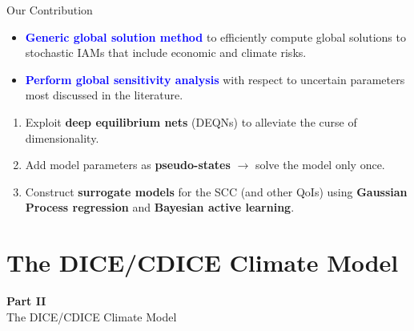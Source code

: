 \documentclass[aspectratio=169,11pt]{beamer}
\newcommand{\emphc}[1]{\textcolor{harvardcrimson}{#1}}
\begin{document}
\begin{frame}{Our Contribution}
\begin{itemize}
    \item \textcolor{blue}{\textbf{Generic global solution method}} to efficiently compute global solutions to stochastic IAMs that include economic and climate risks.
    \item \textcolor{blue}{\textbf{Perform global sensitivity analysis}} with respect to uncertain parameters most discussed in the literature.
\end{itemize}

\vspace{0.2cm}
\begin{enumerate}
    \item Exploit \textbf{deep equilibrium nets} (DEQNs) to alleviate the curse of dimensionality.
    \item Add model parameters as \textbf{pseudo-states} $\rightarrow$ solve the model only \emphc{once}.
    \item Construct \textbf{surrogate models} for the SCC (and other QoIs) using \textbf{Gaussian Process regression} and \textbf{Bayesian active learning}.
\end{enumerate}
\end{frame}

\section{The DICE/CDICE Climate Model}

\begin{frame}{}
\vfill
\begin{center}
{\Huge \textcolor{uzhblue}{\textbf{Part II}}}\\[12pt]
{\LARGE The DICE/CDICE Climate Model}
\end{center}
\vfill
\end{frame}
\end{document}
